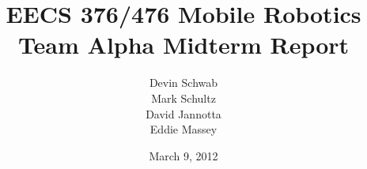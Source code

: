 \documentclass[10pt,letterpaper,draft]{report}
\author{Devin Schwab\\
  Mark Schultz\\
  David Jannotta\\
  Eddie Massey}
\title{EECS 376/476 Mobile Robotics\\
  Team Alpha Midterm Report} \date{March 9, 2012}
\begin{document}

\listoftodos
\maketitle

\tableofcontents
\newpage











\end{document}
